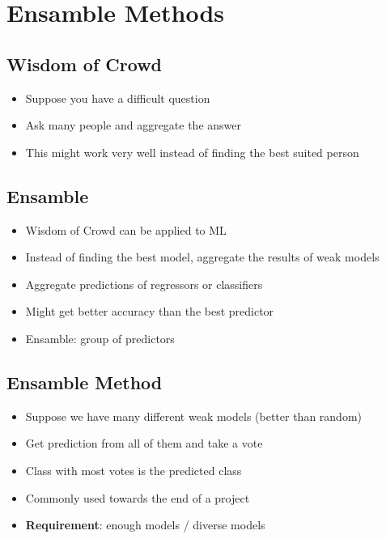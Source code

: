 \section{Ensamble Methods}
\subsection{Wisdom of Crowd}
\begin{itemize}
    \item Suppose you have a difficult question
    \item Ask many people and aggregate the answer
    \item This might work very well instead of finding the best suited person
\end{itemize}

\subsection{Ensamble}
\begin{itemize}
    \item Wisdom of Crowd can be applied to ML
    \item Instead of finding the best model, aggregate the results of weak models
    \item Aggregate predictions of regressors or classifiers
    \item Might get better accuracy than the best predictor
    \item Ensamble: group of predictors
\end{itemize}

\subsection{Ensamble Method}
\begin{itemize}
    \item Suppose we have many different weak models (better than random)
    \item Get prediction from all of them and take a vote
    \item Class with most votes is the predicted class
    \item Commonly used towards the end of a project
    \item \textbf{Requirement}: enough models / diverse models
\end{itemize}


